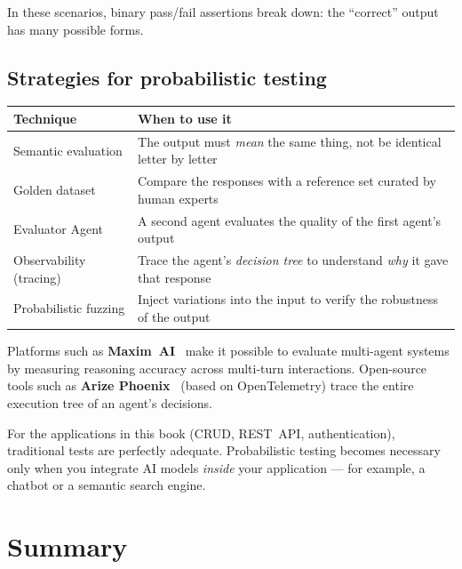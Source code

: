 In these scenarios, binary pass/fail assertions break down: the ``correct'' output has many possible forms.

\subsection{Strategies for probabilistic testing}

\begin{center}
\begin{tabularx}{\textwidth}{l X}
\toprule
\textbf{Technique} & \textbf{When to use it} \\
\midrule
Semantic evaluation & The output must \textit{mean} the same thing, not be identical letter by letter \\
Golden dataset & Compare the responses with a reference set curated by human experts \\
Evaluator Agent & A second agent evaluates the quality of the first agent's output \\
Observability (tracing) & Trace the agent's \textit{decision tree} to understand \textit{why} it gave that response \\
Probabilistic fuzzing & Inject variations into the input to verify the robustness of the output \\
\bottomrule
\end{tabularx}
\end{center}

\begin{tipbox}
Platforms such as \textbf{Maxim~AI}~\cite{maxim:eval-2026} make it possible to evaluate multi-agent systems by measuring reasoning accuracy across multi-turn interactions. Open-source tools such as \textbf{Arize Phoenix}~\cite{arize:phoenix} (based on OpenTelemetry) trace the entire execution tree of an agent's decisions.
\end{tipbox}

\begin{notebox}
For the applications in this book (CRUD, REST~API, authentication), traditional tests are perfectly adequate. Probabilistic testing becomes necessary only when you integrate AI models \textit{inside} your application --- for example, a chatbot or a semantic search engine.
\end{notebox}

\section*{Summary}

